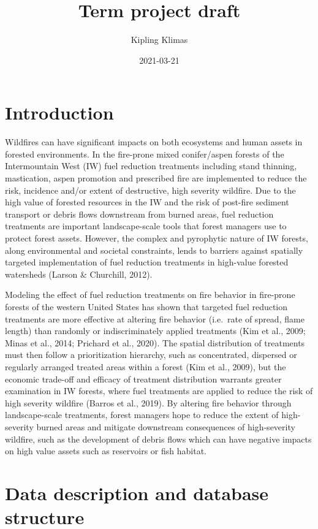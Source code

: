 \documentclass[]{book}
\title{Term project draft}
\author{Kipling Klimas}
\date{2021-03-21}
\begin{document}
\maketitle

{
\setcounter{tocdepth}{1}
\tableofcontents
}
\hypertarget{introduction}{%
\chapter{Introduction}\label{introduction}}

Wildfires can have significant impacts on both ecosystems and human assets in forested environments. In the fire-prone mixed conifer/aspen forests of the Intermountain West (IW) fuel reduction treatments including stand thinning, mastication, aspen promotion and prescribed fire are implemented to reduce the risk, incidence and/or extent of destructive, high severity wildfire. Due to the high value of forested resources in the IW and the risk of post-fire sediment transport or debris flows downstream from burned areas, fuel reduction treatments are important landscape-scale tools that forest managers use to protect forest assets. However, the complex and pyrophytic nature of IW forests, along environmental and societal constraints, lends to barriers against spatially targeted implementation of fuel reduction treatments in high-value forested watersheds (Larson \& Churchill, 2012).

Modeling the effect of fuel reduction treatments on fire behavior in fire-prone forests of the western United States has shown that targeted fuel reduction treatments are more effective at altering fire behavior (i.e.~rate of spread, flame length) than randomly or indiscriminately applied treatments (Kim et al., 2009; Minas et al., 2014; Prichard et al., 2020). The spatial distribution of treatments must then follow a prioritization hierarchy, such as concentrated, dispersed or regularly arranged treated areas within a forest (Kim et al., 2009), but the economic trade-off and efficacy of treatment distribution warrants greater examination in IW forests, where fuel treatments are applied to reduce the risk of high severity wildfire (Barros et al., 2019). By altering fire behavior through landscape-scale treatments, forest managers hope to reduce the extent of high-severity burned areas and mitigate downstream consequences of high-severity wildfire, such as the development of debris flows which can have negative impacts on high value assets such as reservoirs or fish habitat.

\hypertarget{data}{%
\chapter{Data description and database structure}\label{data}}
\end{document}
